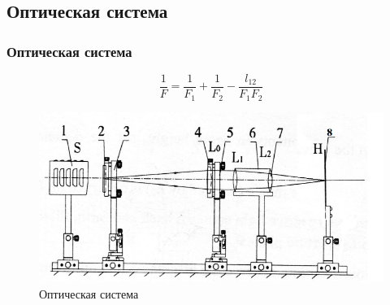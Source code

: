 \documentclass[10pt,pdf,hyperref={unicode}]{beamer}
\begin{document}
\begin{frame}
\section{Оптическая система}
\frametitle{Оптическая система} 



\begin{equation}
	\frac{1}{F} = \frac{1}{F_1} + \frac{1}{F_2} - \frac{l_{12}}{F_1 F_2}
	\label{eq:2}
\end{equation}



\begin{figure}[H]
	\centering
	\includegraphics[width=0.7\linewidth]{5}
	\caption{Оптическая система}%
	\label{fig:3_1}
\end{figure}
\end{frame}
\end{document}
